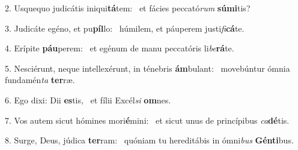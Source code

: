 2. Usquequo judicátis iniqui\textbf{tá}tem: \ast\  et fácies peccató\textit{rum} \textbf{sú}\textbf{mi}tis?\

3. Judicáte egéno, et pu\textbf{píl}lo: \ast\  húmilem, et páuperem justi\textit{fi}\textbf{cá}te.\

4. Erípite \textbf{páu}perem: \ast\  et egénum de manu peccatóris li\textit{be}\textbf{rá}te.\

5. Nesciérunt, neque intellexérunt, in ténebris \textbf{ám}bulant: \ast\  movebúntur ómnia fundamén\textit{ta} \textbf{ter}ræ.\

6. Ego dixi: Dii \textbf{es}tis, \ast\  et fílii Excél\textit{si} \textbf{om}nes.\

7. Vos autem sicut hómines mori\textbf{é}mini: \ast\  et sicut unus de princípibus \textit{ca}\textbf{dé}tis.\

8. Surge, Deus, júdica \textbf{ter}ram: \ast\  quóniam tu hereditábis in ómni\textit{bus} \textbf{Gén}\textbf{ti}bus.\

